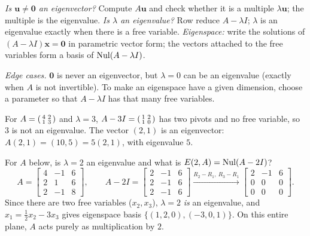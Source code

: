 \documentclass[10pt]{scrartcl}
\newcommand{\vv}[1]{\mathbf{#1}}
\begin{document}
\begin{steps}
  \ii \emph{Is $\vv u\ne\vv 0$ an eigenvector?} Compute $A\vv u$ and check whether it is a multiple $\lambda\vv u$; the multiple is the eigenvalue.
  \ii \emph{Is $\lambda$ an eigenvalue?} Row reduce $A-\lambda I$; $\lambda$ is an eigenvalue exactly when there is a free variable.
  \ii \emph{Eigenspace:} write the solutions of $(A-\lambda I)\vv x=\vv 0$ in parametric vector form; the vectors attached to the free variables form a basis of $\operatorname{Nul}(A-\lambda I)$.
\end{steps}
\emph{Edge cases.} $\vv 0$ is never an eigenvector, but $\lambda=0$ can be an eigenvalue (exactly when $A$ is not invertible). To make an eigenspace have a given dimension, choose a parameter so that $A-\lambda I$ has that many free variables.

\begin{example*}
For $A=\begin{psmallmatrix}4&2\\1&3\end{psmallmatrix}$ and $\lambda=3$, $A-3I=\begin{psmallmatrix}1&2\\1&0\end{psmallmatrix}$ has two pivots and no free variable, so $3$ is not an eigenvalue. The vector $(2,1)$ is an eigenvector: $A(2,1)=(10,5)=5(2,1)$, with eigenvalue $5$.
\end{example*}

\begin{example*}
  For $A$ below, is $\lambda=2$ an eigenvalue and what is $E(2,A)=\operatorname{Nul}(A-2I)$?
  \[
    A=\begin{bmatrix}4&-1&6\\2&1&6\\2&-1&8\end{bmatrix},\qquad
    A-2I = \begin{bmatrix}2&-1&6\\2&-1&6\\2&-1&6\end{bmatrix}
    \xrightarrow{R_2-R_1,\ R_3-R_1}
    \begin{bmatrix}2&-1&6\\0&0&0\\0&0&0\end{bmatrix}.
  \]
  Since there are two free variables ($x_2,x_3$), $\lambda=2$ \emph{is} an eigenvalue, and $x_1=\frac12 x_2-3x_3$ gives eigenspace basis $\{(1,2,0),(-3,0,1)\}$. On this entire plane, $A$ acts purely as multiplication by $2$.
\end{example*}
\end{document}
